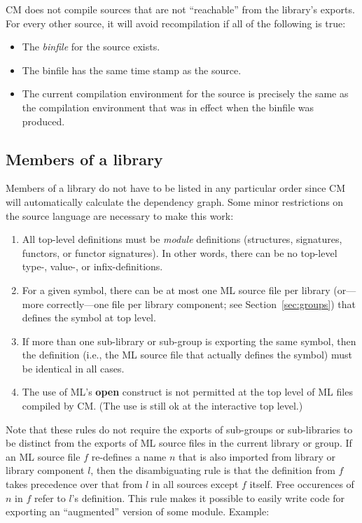 \documentclass[titlepage,letterpaper]{article}
\begin{document}
CM does not compile sources that are not ``reachable'' from the
library's exports.  For every other source, it will avoid
recompilation if all of the following is true:

\begin{itemize}
\item The {\em binfile} for the source exists.
\item The binfile has the same time stamp as the source.
\item The current compilation environment for the source is precisely
the same as the compilation environment that was in effect when the
binfile was produced.
\end{itemize}

\subsection{Members of a library}

Members of a library do not have to be listed in any particular order
since CM will automatically calculate the dependency graph.  Some
minor restrictions on the source language are necessary to make this
work:
\begin{enumerate}
\item All top-level definitions must be {\em module} definitions
(structures, signatures, functors, or functor signatures).  In other
words, there can be no top-level type-, value-, or infix-definitions.
\item For a given symbol, there can be at most one ML source file per
library (or---more correctly---one file per library component; see
Section~\ref{sec:groups}) that defines the symbol at top level.
\item If more than one sub-library or sub-group is exporting the same
symbol, then the definition (i.e., the ML source file that actually
defines the symbol) must be identical in all cases.
\label{rule:diamond}
\item The use of ML's {\bf open} construct is not permitted at the top
level of ML files compiled by CM.  (The use is still ok at the
interactive top level.)
\end{enumerate}

Note that these rules do not require the exports of sub-groups or
sub-libraries to be distinct from the exports of ML source files in
the current library or group.  If an ML source file $f$ re-defines a
name $n$ that is also imported from library or library component $l$,
then the disambiguating rule is that the definition from $f$ takes
precedence over that from $l$ in all sources except $f$ itself.  Free
occurences of $n$ in $f$ refer to $l$'s definition.  This rule makes
it possible to easily write code for exporting an ``augmented''
version of some module.  Example:
\end{document}
